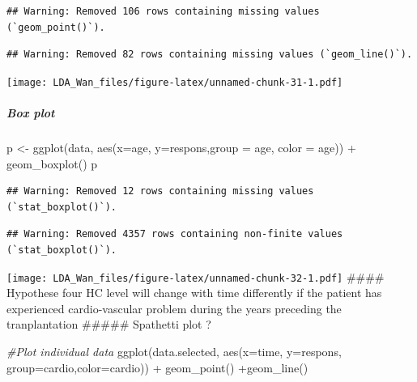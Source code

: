 \documentclass[
]{article}
\newenvironment{Shaded}{\begin{snugshade}}{\end{snugshade}}
\newcommand{\AttributeTok}[1]{\textcolor[rgb]{0.77,0.63,0.00}{#1}}
\newcommand{\CommentTok}[1]{\textcolor[rgb]{0.56,0.35,0.01}{\textit{#1}}}
\newcommand{\FunctionTok}[1]{\textcolor[rgb]{0.00,0.00,0.00}{#1}}
\newcommand{\NormalTok}[1]{#1}
\newcommand{\OtherTok}[1]{\textcolor[rgb]{0.56,0.35,0.01}{#1}}
\newcommand{\SpecialCharTok}[1]{\textcolor[rgb]{0.00,0.00,0.00}{#1}}
\begin{document}
\begin{verbatim}
## Warning: Removed 106 rows containing missing values (`geom_point()`).
\end{verbatim}

\begin{verbatim}
## Warning: Removed 82 rows containing missing values (`geom_line()`).
\end{verbatim}

\texttt{[image: LDA\_Wan\_files/figure-latex/unnamed-chunk-31-1.pdf]}

\hypertarget{box-plot}{%
\subparagraph{Box plot}\label{box-plot}}

\begin{Shaded}
\begin{Highlighting}[]
\NormalTok{p }\OtherTok{\textless{}{-}} \FunctionTok{ggplot}\NormalTok{(data, }\FunctionTok{aes}\NormalTok{(}\AttributeTok{x=}\NormalTok{age, }\AttributeTok{y=}\NormalTok{respons,}\AttributeTok{group =}\NormalTok{ age, }\AttributeTok{color =}\NormalTok{ age)) }\SpecialCharTok{+}  
  \FunctionTok{geom\_boxplot}\NormalTok{()}
\NormalTok{p}
\end{Highlighting}
\end{Shaded}

\begin{verbatim}
## Warning: Removed 12 rows containing missing values (`stat_boxplot()`).
\end{verbatim}

\begin{verbatim}
## Warning: Removed 4357 rows containing non-finite values (`stat_boxplot()`).
\end{verbatim}

\texttt{[image: LDA\_Wan\_files/figure-latex/unnamed-chunk-32-1.pdf]}
\#\#\#\# Hypothese four HC level will change with time differently if
the patient has experienced cardio-vascular problem during the years
preceding the tranplantation \#\#\#\#\# Spathetti plot ?

\begin{Shaded}
\begin{Highlighting}[]
\CommentTok{\#Plot individual data}
\FunctionTok{ggplot}\NormalTok{(data.selected, }\FunctionTok{aes}\NormalTok{(}\AttributeTok{x=}\NormalTok{time, }\AttributeTok{y=}\NormalTok{respons, }\AttributeTok{group=}\NormalTok{cardio,}\AttributeTok{color=}\NormalTok{cardio)) }\SpecialCharTok{+} \FunctionTok{geom\_point}\NormalTok{()  }\SpecialCharTok{+}\FunctionTok{geom\_line}\NormalTok{()}
\end{Highlighting}
\end{Shaded}
\end{document}
